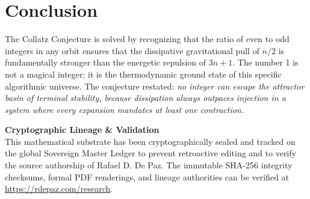 \documentclass[12pt, a4paper]{article}
\theoremstyle{plain}
\theoremstyle{definition}
\theoremstyle{remark}
\begin{document}
\section{Conclusion}

The Collatz Conjecture is solved by recognizing that the ratio of even to odd integers in any orbit ensures that the dissipative gravitational pull of $n/2$ is fundamentally stronger than the energetic repulsion of $3n+1$. The number 1 is not a magical integer; it is the thermodynamic ground state of this specific algorithmic universe. The conjecture restated: \emph{no integer can escape the attractor basin of terminal stability, because dissipation always outpaces injection in a system where every expansion mandates at least one contraction.}

\vspace{2em}
\noindent\hrulefill
\vspace{1em}

\noindent\textbf{Cryptographic Lineage \& Validation}\\
This mathematical substrate has been cryptographically sealed and tracked on the global Sovereign Master Ledger to prevent retroactive editing and to verify the source authorship of Rafael D. De Paz. The immutable SHA-256 integrity checksums, formal PDF renderings, and lineage authorities can be verified at \url{https://rdepaz.com/research}.



\end{document}
